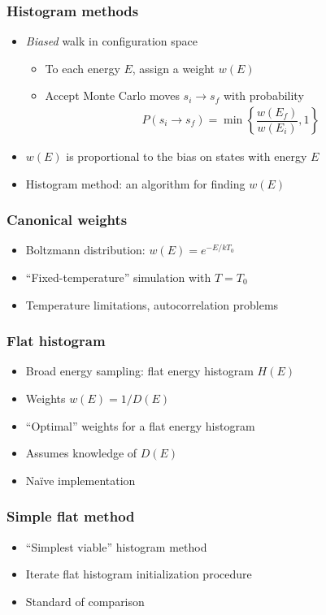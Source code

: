 \documentclass{beamer}
\newcommand{\f}[2]{\dfrac{#1}{#2}} %
\newcommand{\p}[1]{\left(#1\right)} %
\renewcommand{\set}[1]{\left\{#1\right\}} %
\let\olditem\item
\renewcommand{\item}{\setlength{\itemsep}{6pt}\olditem}
\begin{document}
\begin{frame}
  \frametitle{Histogram methods}
  \begin{itemize}
  \item {\it Biased} walk in configuration space
    \begin{itemize}
    \item To each energy $E$, assign a weight $w\p{E}$
    \item Accept Monte Carlo moves $s_i\to s_f$ with probability
      \begin{align*}
        P\p{s_i\to s_f}=\min\set{\f{w\p{E_f}}{w\p{E_i}},1}
      \end{align*}
    \end{itemize}
  \item $w\p{E}$ is proportional to the bias on states with energy $E$
  \item Histogram method: an algorithm for finding $w\p{E}$
  \end{itemize}
\end{frame}

\begin{frame}
  \frametitle{Canonical weights}
  \begin{itemize}
  \item Boltzmann distribution: $w\p{E}=e^{-E/kT_0}$
  \item ``Fixed-temperature'' simulation with $T=T_0$
  \item Temperature limitations, autocorrelation problems
  \end{itemize}
\end{frame}

\begin{frame}
  \frametitle{Flat histogram}
  \begin{itemize}
  \item Broad energy sampling: flat energy histogram $H\p{E}$
  \item Weights $w\p{E}=1/D\p{E}$
  \item ``Optimal'' weights for a flat energy histogram
  \item Assumes knowledge of $D\p{E}$
  \item Na\"ive implementation
  \end{itemize}
\end{frame}

\begin{frame}
  \frametitle{Simple flat method}
  \begin{itemize}
  \item ``Simplest viable'' histogram method
  \item Iterate flat histogram initialization procedure
  \item Standard of comparison
  \end{itemize}
\end{frame}
\end{document}
